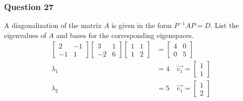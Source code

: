 \documentclass{math}
\begin{document}
\subsubsection*{Question 27}
A diagonalization of the matrix \( A \) is given in the form \( P^{-1}AP = D \).
List the eigenvalues of \( A \) and bases for the corresponding eigenspaces.
\begin{align*}
  \begin{bmatrix}
    2 & -1 \\
    -1 & 1
  \end{bmatrix}\begin{bmatrix}
    3 & 1 \\
    -2 & 6
  \end{bmatrix}\begin{bmatrix}
    1 & 1 \\
    1 & 2
  \end{bmatrix} &= \begin{bmatrix}
    4 & 0 \\
    0 & 5
  \end{bmatrix} \\
  \lambda_1 &= 4 \quad \vec{v_1} = \begin{bmatrix}1 \\ 1\end{bmatrix} \\
  \lambda_2 &= 5 \quad \vec{v_1} = \begin{bmatrix}1 \\ 2\end{bmatrix}
\end{align*}
\end{document}
